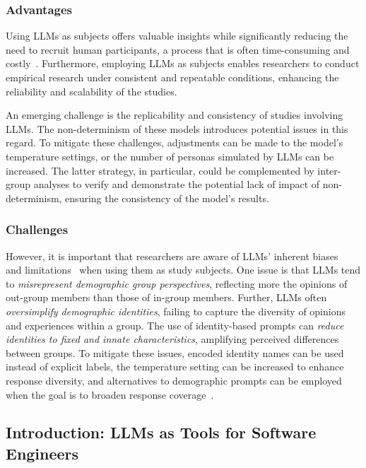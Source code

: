 \subsubsection{Advantages}

Using LLMs as subjects offers valuable insights while significantly reducing the need to recruit human participants, a process that is often time-consuming and costly~\cite{DBLP:conf/vl/Madampe0HO24}. 
Furthermore, employing LLMs as subjects enables researchers to conduct empirical research under consistent and repeatable conditions, enhancing the reliability and scalability of the studies.

An emerging challenge is the replicability and consistency of studies involving LLMs. The non-determinism of these models introduces potential issues in this regard. To mitigate these challenges, adjustments can be made to the model's temperature settings, or the number of personas simulated by LLMs can be increased. The latter strategy, in particular, could be complemented by inter-group analyses to verify and demonstrate the potential lack of impact of non-determinism, ensuring the consistency of the model's results.

\subsubsection{Challenges}

However, it is important that researchers are aware of LLMs' inherent biases~\cite{Crowell2023} and limitations~\cite{DBLP:journals/ais/HardingDLL24, DBLP:journals/corr/abs-2402-01908} when using them as study subjects.
One issue is that LLMs tend to \emph{misrepresent demographic group perspectives}, reflecting more the opinions of out-group members than those of in-group members.
Further, LLMs often \emph{oversimplify demographic identities}, failing to capture the diversity of opinions and experiences within a group.
The use of identity-based prompts can \emph{reduce identities to fixed and innate characteristics}, amplifying perceived differences between groups.
To mitigate these issues, encoded identity names can be used instead of explicit labels, the temperature setting can be increased to enhance response diversity, and alternatives to demographic prompts can be employed when the goal is to broaden response coverage~\cite{DBLP:journals/ais/HardingDLL24, DBLP:journals/corr/abs-2402-01908}.


\subsection{Introduction: LLMs as Tools for Software Engineers}

